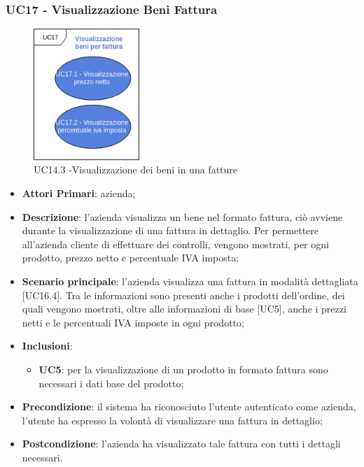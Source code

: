\subsubsection{UC17 - Visualizzazione Beni Fattura}
\begin{figure}[h]
	\includegraphics[width=4cm]{res/images/UC17-VisualizzazioneBeniFattura.png}
	\centering
	\caption{UC14.3 -Visualizzazione dei beni in una fatture}
\end{figure}
\begin{itemize}
	\item \textbf{Attori Primari}: azienda;
	\item \textbf{Descrizione}: l'azienda visualizza un bene nel formato fattura, ciò avviene durante la visualizzazione di una fattura in dettaglio. Per permettere all'azienda cliente di effettuare dei controlli, vengono mostrati, per ogni prodotto, prezzo netto e percentuale IVA imposta;
	\item \textbf{Scenario principale}: l'azienda visualizza una fattura in modalità dettagliata [UC16.4]. Tra le informazioni sono presenti anche i prodotti dell'ordine, dei quali vengono mostrati, oltre alle informazioni di base [UC5], anche i prezzi netti e le percentuali IVA imposte in ogni prodotto;
	\item \textbf{Inclusioni}: 
	\begin{itemize}
		\item \textbf{UC5}: per la visualizzazione di un prodotto in formato fattura sono necessari i dati base del prodotto;
	\end{itemize}
	\item \textbf{Precondizione}: il sistema ha riconosciuto l'utente autenticato come azienda, l'utente ha espresso la volontà di visualizzare una fattura in dettaglio;
	\item \textbf{Postcondizione}: l'azienda ha visualizzato tale fattura con tutti i dettagli necessari.
\end{itemize} 
